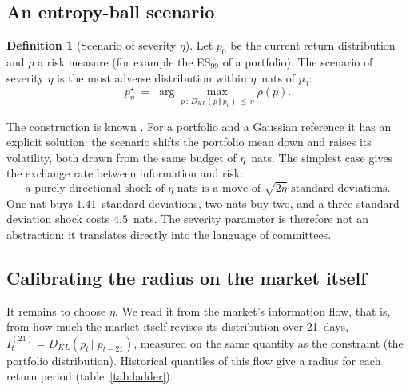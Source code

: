 \documentclass[11pt]{article}
\theoremstyle{definition}
\newtheorem{definition}{Definition}
\newcommand{\KL}[2]{D_{KL}\!\left(#1\,\Vert\,#2\right)}
\begin{document}
\subsection{An entropy-ball scenario}

\begin{definition}[Scenario of severity $\eta$]
Let $p_0$ be the current return distribution and $\rho$ a risk measure (for
example the ES$_{99}$ of a portfolio). The scenario of severity $\eta$ is the
most adverse distribution within $\eta$~nats of $p_0$:
\begin{equation}
\label{eq:ball}
p^\star_\eta \;=\; \arg\max_{p\,:\,\KL{p}{p_0}\,\le\,\eta} \rho(p).
\end{equation}
\end{definition}

The construction is known \citep{breuer2013,glasserman2014}. For a portfolio
and a Gaussian reference it has an explicit solution: the scenario shifts the
portfolio mean down and raises its volatility, both drawn from the same budget
of $\eta$~nats. The simplest case gives the exchange rate between information
and risk:
\begin{equation}
\text{a purely directional shock of }\eta\text{ nats is a move of }\sqrt{2\eta}\text{ standard deviations.}
\end{equation}
One nat buys $1.41$~standard deviations, two nats buy two, and a
three-standard-deviation shock costs $4.5$~nats. The severity parameter is
therefore not an abstraction: it translates directly into the language of
committees.

\subsection{Calibrating the radius on the market itself}

It remains to choose $\eta$. We read it from the market's information flow,
that is, from how much the market itself revises its distribution over
21~days, $I^{(21)}_t=\KL{p_t}{p_{t-21}}$, measured on the same quantity as the
constraint (the portfolio distribution). Historical quantiles of this flow give
a radius for each return period (table~\ref{tab:ladder}).
\end{document}
